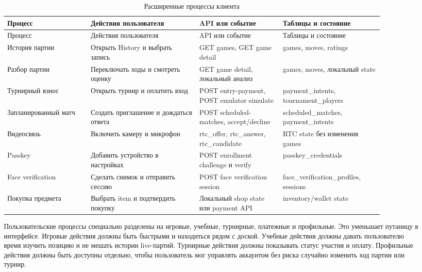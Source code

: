 \noindent\scriptsize
\setlength{\tabcolsep}{3pt}
\renewcommand{\arraystretch}{1.16}
\begin{longtable}{|>{\RaggedRight\arraybackslash}p{0.20\linewidth}|>{\RaggedRight\arraybackslash}p{0.26\linewidth}|>{\RaggedRight\arraybackslash}p{0.20\linewidth}|>{\RaggedRight\arraybackslash}p{0.24\linewidth}|}
\caption{Расширенные процессы клиента}\label{tab:extended-client-processes}\\
\hline
Процесс & Действия пользователя & API или событие & Таблицы и состояние\\ \hline
\endfirsthead
\hline
Процесс & Действия пользователя & API или событие & Таблицы и состояние\\ \hline
\endhead
История партии & Открыть History и выбрать запись & GET games, GET game detail & games, moves, ratings\\ \hline
Разбор партии & Переключать ходы и смотреть оценку & GET game detail, локальный анализ & games, moves, локальный state\\ \hline
Турнирный взнос & Открыть турнир и оплатить вход & POST entry-payment, POST emulator simulate & payment_intents, tournament_players\\ \hline
Запланированный матч & Создать приглашение и дождаться ответа & POST scheduled-matches, accept/decline & scheduled_matches, payment_intents\\ \hline
Видеосвязь & Включить камеру и микрофон & rtc_offer, rtc_answer, rtc_candidate & RTC state без изменения games\\ \hline
Passkey & Добавить устройство в настройках & POST enrollment challenge и verify & passkey_credentials\\ \hline
Face verification & Сделать снимок и отправить сессию & POST face verification session & face_verification_profiles, sessions\\ \hline
Покупка предмета & Выбрать item и подтвердить покупку & Локальный shop state или payment API & inventory/wallet state\\ \hline
\end{longtable}
\normalsize

Пользовательские процессы специально разделены на игровые, учебные, турнирные, платежные и профильные. Это уменьшает путаницу в интерфейсе. Игровые действия должны быть быстрыми и находиться рядом с доской. Учебные действия должны давать пользователю время изучить позицию и не мешать истории live-партий. Турнирные действия должны показывать статус участия и оплату. Профильные действия должны быть доступны отдельно, чтобы пользователь мог управлять аккаунтом без риска случайно изменить ход партии или турнир.

